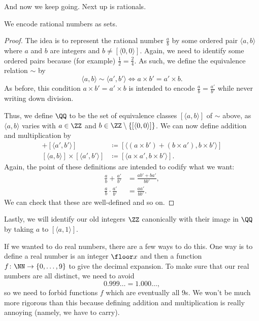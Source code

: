 \documentclass[../notes.tex]{subfiles}
\begin{document}
And now we keep going. Next up is rationals.
\begin{exe}
	We encode rational numbers as sets.
\end{exe}
\begin{proof}
	The idea is to represent the rational number $\frac ab$ by some ordered pair $\langle a,b\rangle$ where $a$ and $b$ are integers and $b\ne[\langle0,0\rangle]$. Again, we need to identify some ordered pairs because (for example) $\frac12=\frac24$. As such, we define the equivalence relation $\sim$ by
	\[\langle a,b\rangle\sim\langle a',b'\rangle\iff a\times b'=a'\times b.\]
	As before, this condition $a\times b'=a'\times b$ is intended to encode $\frac ab=\frac{a'}{b'}$ while never writing down division.

	Thus, we define $\QQ$ to be the set of equivalence classes $[\langle a,b\rangle]$ of $\sim$ above, as $\langle a,b\rangle$ varies with $a\in\ZZ$ and $b\in\ZZ\setminus\{[\langle0,0\rangle]\}$. We can now define addition and multiplication by
	\begin{align*}
		[\langle a,b\rangle]+[\langle a',b'\rangle] &\coloneqq [\langle(a\times b')+(b\times a'),b\times b'\rangle] \\
		[\langle a,b\rangle]\times[\langle a',b'\rangle] &\coloneqq [\langle a\times a',b\times b'\rangle].
	\end{align*}
	Again, the point of these definitions are intended to codify what we want:
	\begin{align*}
		\frac ab+\frac{a'}{b'} &= \frac{ab'+ba'}{bb'}, \\
		\frac ab\cdot\frac{a'}{b'} &= \frac{aa'}{bb'}.
	\end{align*}
	We can check that these are well-defined and so on.
\end{proof}
\begin{remark}
	Lastly, we will identify our old integers $\ZZ$ canonically with their image in $\QQ$ by taking $a$ to $[\langle a,1\rangle]$.
\end{remark}
If we wanted to do real numbers, there are a few ways to do this. One way is to define a real number is an integer $\floor x$ and then a function $f\colon\NN\to\{0,\ldots,9\}$ to give the decimal expansion. To make sure that our real numbers are all distinct, we need to avoid
\[0.999\ldots=1.000\ldots,\]
so we need to forbid functions $f$ which are eventually all $9$s. We won't be much more rigorous than this because defining addition and multiplication is really annoying (namely, we have to carry).
\end{document}
